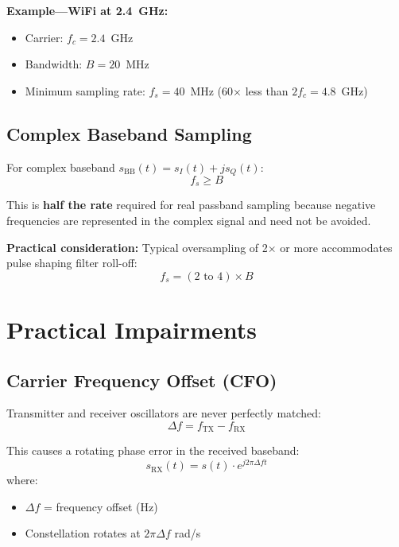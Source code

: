 \textbf{Example---WiFi at 2.4~GHz:}
\begin{itemize}
\item Carrier: $f_c = 2.4$~GHz
\item Bandwidth: $B = 20$~MHz
\item Minimum sampling rate: $f_s = 40$~MHz (60$\times$ less than $2f_c = 4.8$~GHz)
\end{itemize}

\subsection{Complex Baseband Sampling}

For complex baseband $s_{\text{BB}}(t) = s_I(t) + js_Q(t)$:
\begin{equation}
f_s \geq B
\end{equation}

This is \textbf{half the rate} required for real passband sampling because negative frequencies are represented in the complex signal and need not be avoided.

\textbf{Practical consideration:} Typical oversampling of 2$\times$ or more accommodates pulse shaping filter roll-off:
\begin{equation}
f_s = (2 \text{ to } 4) \times B
\end{equation}

\section{Practical Impairments}

\subsection{Carrier Frequency Offset (CFO)}

Transmitter and receiver oscillators are never perfectly matched:
\begin{equation}
\Delta f = f_{\text{TX}} - f_{\text{RX}}
\end{equation}

This causes a rotating phase error in the received baseband:
\begin{equation}
s_{\text{RX}}(t) = s(t) \cdot e^{j2\pi \Delta f t}
\end{equation}
where:
\begin{itemize}
\item $\Delta f$ = frequency offset (Hz)
\item Constellation rotates at $2\pi \Delta f$ rad/s
\end{itemize}

